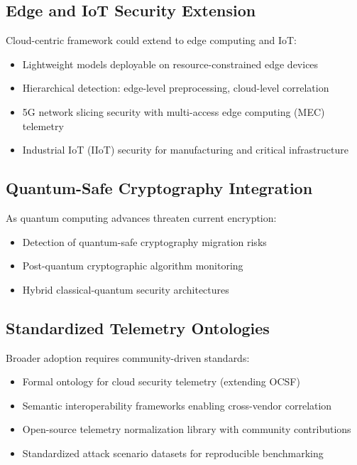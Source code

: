 \subsection{Edge and IoT Security Extension}
Cloud-centric framework could extend to edge computing and IoT:
\begin{itemize}
    \item Lightweight models deployable on resource-constrained edge devices
    \item Hierarchical detection: edge-level preprocessing, cloud-level correlation
    \item 5G network slicing security with multi-access edge computing (MEC) telemetry
    \item Industrial IoT (IIoT) security for manufacturing and critical infrastructure
\end{itemize}

\subsection{Quantum-Safe Cryptography Integration}
As quantum computing advances threaten current encryption:
\begin{itemize}
    \item Detection of quantum-safe cryptography migration risks
    \item Post-quantum cryptographic algorithm monitoring
    \item Hybrid classical-quantum security architectures
\end{itemize}

\subsection{Standardized Telemetry Ontologies}
Broader adoption requires community-driven standards:
\begin{itemize}
    \item Formal ontology for cloud security telemetry (extending OCSF)
    \item Semantic interoperability frameworks enabling cross-vendor correlation
    \item Open-source telemetry normalization library with community contributions
    \item Standardized attack scenario datasets for reproducible benchmarking
\end{itemize}

